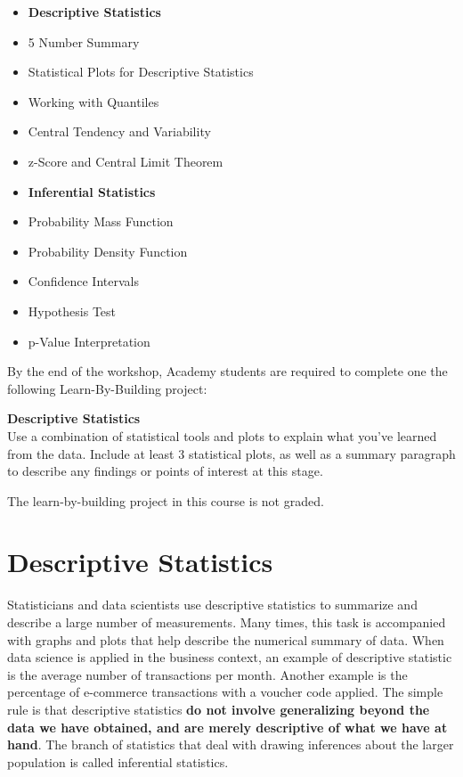 \documentclass[]{article}
\begin{document}
\begin{itemize}
\item
  \textbf{Descriptive Statistics}
\item
  5 Number Summary
\item
  Statistical Plots for Descriptive Statistics\\
\item
  Working with Quantiles\\
\item
  Central Tendency and Variability
\item
  z-Score and Central Limit Theorem
\item
  \textbf{Inferential Statistics}\\
\item
  Probability Mass Function
\item
  Probability Density Function
\item
  Confidence Intervals\\
\item
  Hypothesis Test
\item
  p-Value Interpretation
\end{itemize}

By the end of the workshop, Academy students are required to complete
one the following Learn-By-Building project:

\textbf{Descriptive Statistics}\\
Use a combination of statistical tools and plots to explain what you've
learned from the data. Include at least 3 statistical plots, as well as
a summary paragraph to describe any findings or points of interest at
this stage.

The learn-by-building project in this course is not graded.

\hypertarget{descriptive-statistics}{%
\section{Descriptive Statistics}\label{descriptive-statistics}}

Statisticians and data scientists use descriptive statistics to
summarize and describe a large number of measurements. Many times, this
task is accompanied with graphs and plots that help describe the
numerical summary of data. When data science is applied in the business
context, an example of descriptive statistic is the average number of
transactions per month. Another example is the percentage of e-commerce
transactions with a voucher code applied. The simple rule is that
descriptive statistics \textbf{do not involve generalizing beyond the
data we have obtained, and are merely descriptive of what we have at
hand}. The branch of statistics that deal with drawing inferences about
the larger population is called inferential statistics.
\end{document}
